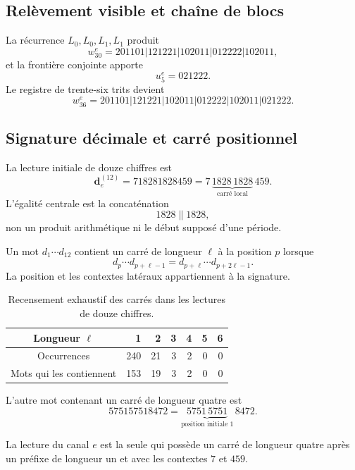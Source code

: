 \subsection{Relèvement visible et chaîne de blocs}

La récurrence \(L_0,L_0,L_1,L_1\) produit
\[
 w_{30}^{e}
 =201101|121221|102011|012222|102011,
\]
et la frontière conjointe apporte
\[
 u_5^e=021222.
\]
Le registre de trente-six trits devient
\[
 w_{36}^{e}
 =201101|121221|102011|012222|102011|021222.
\]

\subsection{Signature décimale et carré positionnel}

La lecture initiale de douze chiffres est
\[
 \mathbf d_e^{(12)}
 =718281828459
 =7\,\underbrace{1828\,1828}_{\text{carré local}}\,459.
\]
L’égalité centrale est la concaténation
\[
 1828\mathbin{\|}1828,
\]
non un produit arithmétique ni le début supposé d’une période.

\begin{definition}
Un mot \(d_1\cdots d_{12}\) contient un carré de longueur \(\ell\)
à la position \(p\) lorsque
\[
 d_p\cdots d_{p+\ell-1}
 =d_{p+\ell}\cdots d_{p+2\ell-1}.
\]
La position et les contextes latéraux appartiennent à la signature.
\end{definition}

\begin{table}[htbp]
\centering
\caption{Recensement exhaustif des carrés dans les lectures de douze chiffres.}
\label{p12-83-c9-s2:tab:censo-cuadrados-e}
\begin{tabular}{c*{6}{r}}
\toprule
Longueur \(\ell\)&1&2&3&4&5&6\\
\midrule
Occurrences&240&21&3&2&0&0\\
Mots qui les contiennent&153&19&3&2&0&0\\
\bottomrule
\end{tabular}
\end{table}

L’autre mot contenant un carré de longueur quatre est
\[
 575157518472
 =\underbrace{5751\,5751}_{\text{position initiale }1}\,8472.
\]

\begin{proposition}
\label{p12-83-c9-s2:prop:cuadrado-posicional-e}
La lecture du canal \(e\) est la seule qui possède un carré de longueur
quatre après un préfixe de longueur un et avec les contextes \(7\) et \(459\).
\end{proposition}

